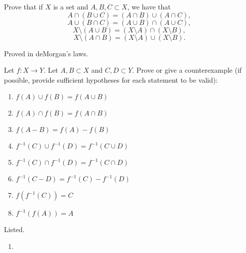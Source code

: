\documentclass{article}
\begin{document}
    \begin{exercise}
      Prove that if $X$ is a set and $A,B,C \subset X$, we have that
      \begin{equation}
        A \cap (B \cup C) = (A \cap B) \cup (A \cap C),
      \end{equation}
      \begin{equation}
        A \cup (B \cap C) = (A \cup B) \cap (A \cup C),
      \end{equation}
      \begin{equation}
        X \setminus (A \cup B) = (X \setminus A) \cap (X \setminus B),
      \end{equation}
      \begin{equation}
        X \setminus (A \cap B) = (X \setminus A) \cup (X \setminus B).
      \end{equation}
    \end{exercise}
    \begin{solution}
      Proved in deMorgan's laws. 
    \end{solution}

    \begin{exercise}
      Let $f: X \to Y$. Let $A,B \subset X$ and $C,D \subset Y$. Prove or give a counterexample (if possible, provide sufficient hypotheses for each statement to be valid):
      \begin{enumerate}
        \item $f(A) \cup f(B) = f(A \cup B)$
        \item $f(A) \cap f(B) = f(A \cap B)$
        \item $f(A - B) = f(A) - f(B)$
        \item $f^{-1}(C) \cup f^{-1}(D) = f^{-1}(C \cup D)$
        \item $f^{-1}(C) \cap f^{-1}(D) = f^{-1}(C \cap D)$
        \item $f^{-1}(C - D) = f^{-1}(C) - f^{-1}(D)$
        \item $f(f^{-1}(C)) = C$
        \item $f^{-1}(f(A)) = A$
      \end{enumerate} 
    \end{exercise}
    \begin{solution}
      Listed. 
      \begin{enumerate}
        \item 
      \end{enumerate}
    \end{solution}
\end{document}
